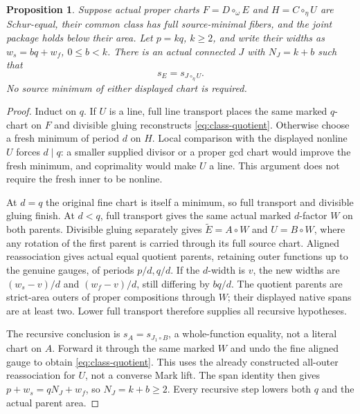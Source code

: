 \documentclass[11pt,a4paper]{amsart}
\numberwithin{equation}{section}
\theoremstyle{plain}
\newtheorem{proposition}[theorem]{Proposition}
\theoremstyle{definition}
\begin{document}
\begin{proposition}\label{prop:class-quotient}
Suppose actual proper charts \(F=D\circ_\omega E\) and \(H=C\circ_\eta U\) are
Schur-equal, their common class has full source-minimal fibers, and the joint
package holds below their area.  Let \(p=kq\), \(k\ge2\), and write their widths
as \(w_s=bq+w_f\), \(0\le b<k\).  There is an actual connected \(J\) with
\(N_J=k+b\) such that
\begin{equation}\label{eq:class-quotient}
 s_E=s_{J\circ_\eta U}.
\end{equation}
No source minimum of either displayed chart is required.
\end{proposition}
\begin{proof}
Induct on \(q\).  If \(U\) is a line, full line transport places the same marked
\(q\)-chart on \(F\) and divisible gluing reconstructs \eqref{eq:class-quotient}.
Otherwise choose a fresh minimum of period \(d\) on \(H\).  Local comparison with
the displayed nonline \(U\) forces \(d\mid q\): a smaller supplied divisor or a
proper gcd chart would improve the fresh minimum, and coprimality would
make \(U\) a line.  This argument does not require the fresh inner to be nonline.

At \(d=q\) the original fine chart is itself a minimum, so full transport and
divisible gluing finish.  At \(d<q\), full transport gives the same actual
marked \(d\)-factor \(W\) on both parents.  Divisible gluing separately gives
\(\widetilde E=A\circ W\) and \(U=B\circ W\), where any rotation of the first
parent is carried through its full source chart.  Aligned reassociation gives
actual equal quotient parents, retaining outer functions up to the genuine
gauges, of periods \(p/d,q/d\).  If the \(d\)-width is \(v\), the new widths are
\((w_s-v)/d\) and \((w_f-v)/d\), still differing by \(bq/d\).
The quotient parents are strict-area outers of proper compositions through
\(W\); their displayed native spans are at least two.  Lower full transport
therefore supplies all recursive hypotheses.

The recursive conclusion is \(s_A=s_{J_1\circ B}\), a whole-function equality,
not a literal chart on \(A\).  Forward it through the same marked \(W\) and undo
the fine aligned gauge to obtain \eqref{eq:class-quotient}.  This uses the
already constructed all-outer reassociation for \(U\), not a converse Mark
lift.  The span identity then gives \(p+w_s=qN_J+w_f\), so \(N_J=k+b\ge2\).
Every recursive step lowers both \(q\) and the actual parent area.
\end{proof}
\end{document}
